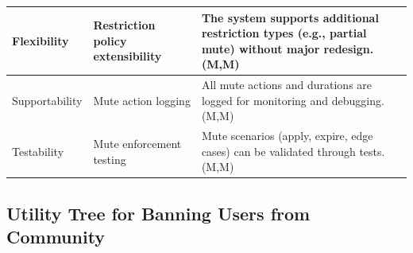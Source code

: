 \documentclass{article}
\begin{document}
\begin{table}[H]
\begin{tabular}{|p{3cm}|p{4cm}|p{7cm}|}
Flexibility
& Restriction policy extensibility
& The system supports additional restriction types (e.g., partial mute) without major redesign. (M,M) \\
\hline

Supportability
& Mute action logging
& All mute actions and durations are logged for monitoring and debugging. (M,M) \\
\hline

Testability
& Mute enforcement testing
& Mute scenarios (apply, expire, edge cases) can be validated through tests. (M,M) \\
\hline

\end{tabular}
\end{table}

\subsection{Utility Tree for Banning Users from Community}
\end{document}

